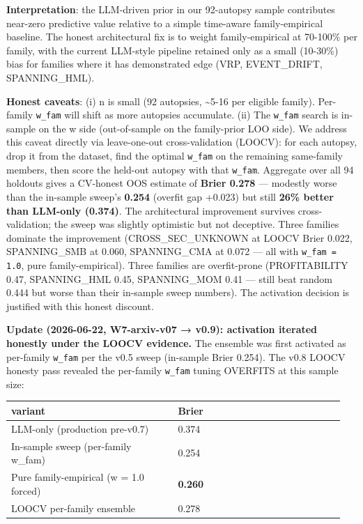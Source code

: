 \documentclass[11pt,a4paper]{article}
\begin{document}
\textbf{Interpretation}: the LLM-driven prior in our 92-autopsy sample contributes near-zero predictive value relative to a simple time-aware family-empirical baseline. The honest architectural fix is to weight family-empirical at 70-100\% per family, with the current LLM-style pipeline retained only as a small (10-30\%) bias for families where it has demonstrated edge (VRP, EVENT\_DRIFT, SPANNING\_HML).

\textbf{Honest caveats}: (i) n is small (92 autopsies, \textasciitilde{}5-16 per eligible family). Per-family \texttt{w\_fam} will shift as more autopsies accumulate. (ii) The \texttt{w\_fam} search is in-sample on the w side (out-of-sample on the family-prior LOO side). We address this caveat directly via leave-one-out cross-validation (LOOCV): for each autopsy, drop it from the dataset, find the optimal \texttt{w\_fam} on the remaining same-family members, then score the held-out autopsy with that \texttt{w\_fam}. Aggregate over all 94 holdouts gives a CV-honest OOS estimate of \textbf{Brier 0.278} — modestly worse than the in-sample sweep's \textbf{0.254} (overfit gap +0.023) but still \textbf{26\% better than LLM-only (0.374)}. The architectural improvement survives cross-validation; the sweep was slightly optimistic but not deceptive. Three families dominate the improvement (CROSS\_SEC\_UNKNOWN at LOOCV Brier 0.022, SPANNING\_SMB at 0.060, SPANNING\_CMA at 0.072 — all with \texttt{w\_fam = 1.0}, pure family-empirical). Three families are overfit-prone (PROFITABILITY 0.47, SPANNING\_HML 0.45, SPANNING\_MOM 0.41 — still beat random 0.444 but worse than their in-sample sweep numbers). The activation decision is justified with this honest discount.

\textbf{Update (2026-06-22, W7-arxiv-v07 → v0.9): activation iterated honestly under the LOOCV evidence.} The ensemble was first activated as per-family \texttt{w\_fam} per the v0.5 sweep (in-sample Brier 0.254). The v0.8 LOOCV honesty pass revealed the per-family \texttt{w\_fam} tuning OVERFITS at this sample size:

\begin{center}
\small
\begin{tabular}{p{0.475\linewidth}p{0.475\linewidth}}
\toprule
\textbf{variant} & \textbf{Brier} \\
\midrule
LLM-only (production pre-v0.7) & 0.374 \\
In-sample sweep (per-family w\_fam) & 0.254 \\
Pure family-empirical (w = 1.0 forced) & \textbf{0.260} \\
LOOCV per-family ensemble & 0.278 \\
\bottomrule
\end{tabular}
\end{center}
\end{document}
